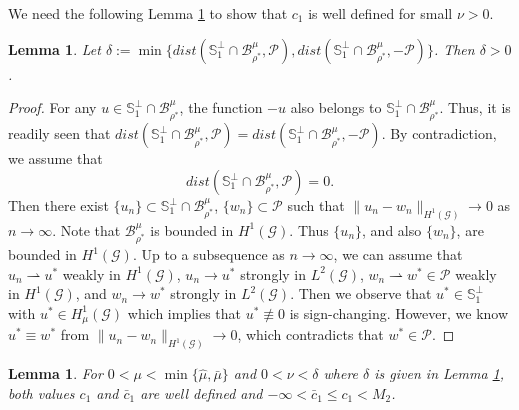 \documentclass[10pt,a4paper]{article}
\newtheorem{lemma}[theorem]{Lemma}
\theoremstyle{definition} \theoremstyle{remark}
\numberwithin{equation}{section}
\newcommand{\G}{\mathcal{G}}
\newcommand{\B}{\mathcal{B}}
\newcommand{\p}{\mathcal{P}}
\begin{document}
	We need the following Lemma \ref{lemfarawayfrom} to show that $c_1$ is well defined for small $\nu > 0$.
	
	\begin{lemma} \label{lemfarawayfrom}
		Let $\delta := \min\{dist(\mathbb{S}_{1}^\perp \cap \B_{\rho^*}^\mu, \p), dist(\mathbb{S}_{1}^\perp \cap \B_{\rho^*}^\mu, -\p)\} $. Then $\delta > 0$.
	\end{lemma}
	
	\begin{proof}
		For any $u \in \mathbb{S}_{1}^\perp \cap \B_{\rho^*}^\mu$, the function $-u$ also belongs to $\mathbb{S}_{1}^\perp \cap \B_{\rho^*}^\mu$. Thus, it is readily seen that $dist(\mathbb{S}_{1}^\perp \cap \B_{\rho^*}^\mu, \p) = dist(\mathbb{S}_{1}^\perp \cap \B_{\rho^*}^\mu, -\p)$. By contradiction, we assume that
		$$
		dist(\mathbb{S}_{1}^\perp \cap \B_{\rho^*}^\mu, \p) = 0.
		$$
		Then there exist $\{u_n\} \subset \mathbb{S}_{1}^\perp \cap \B_{\rho^*}^\mu$, $\{w_n\} \subset \p$ such that $\|u_n - w_n\|_{H^1(\G)} \to 0$ as $n \to \infty$. Note that $\B_{\rho^*}^\mu$ is bounded in $H^1(\G)$. Thus $\{u_n\}$, and also $\{w_n\}$, are bounded in $H^1(\G)$. Up to a subsequence as $n \to \infty$, we can assume that $u_n \rightharpoonup u^*$  weakly in $H^1(\G)$, $u_n \to u^*$ strongly in $L^2(\G)$, $w_n \rightharpoonup w^* \in \p$ weakly in $H^1(\G)$, and $w_n \to w^*$ strongly in $L^2(\G)$. Then we observe that $u^* \in \mathbb{S}_{1}^\perp$ with $u^* \in H_{\mu}^1(\G)$
		which implies that $u^* \not\equiv 0$ is sign-changing. However, we know $u^* \equiv w^*$ from $\|u_n - w_n\|_{H^1(\G)} \to 0$, which contradicts that $w^* \in \p$. 
	\end{proof}


\begin{lemma} \label{lemwelldef}
	For $0 < \mu < \min\{\hat{\mu},\bar{\mu}\}$ and $0 < \nu < \delta$ where $\delta$ is given in Lemma \ref{lemfarawayfrom}, both values $c_1$ and $\bar{c}_1$ are well defined and $- \infty <\bar{c}_1 \leq c_1 < M_2$.
\end{lemma}
\end{document}
